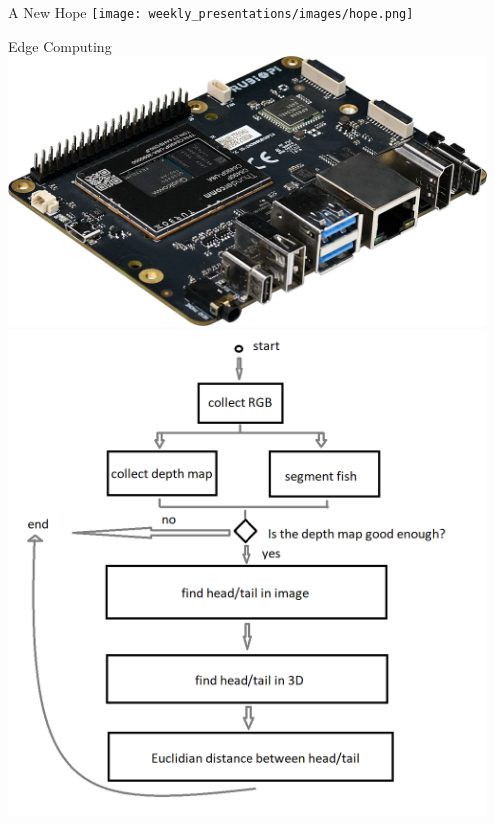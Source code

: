 \begin{frame}{A New Hope}
    \hspace*{0.025\textwidth}  %
    \texttt{[image: weekly\_presentations/images/hope.png]}
\end{frame}

\begin{frame}{Edge Computing}
    \centering
    \includegraphics[height=0.8\textheight,width=0.95\textwidth,keepaspectratio]{images/rubik-pi-3-1.webp}
    \includegraphics[height=0.8\textheight,width=0.95\textwidth,keepaspectratio]{images/dwe-diagram.png}

\end{frame}
